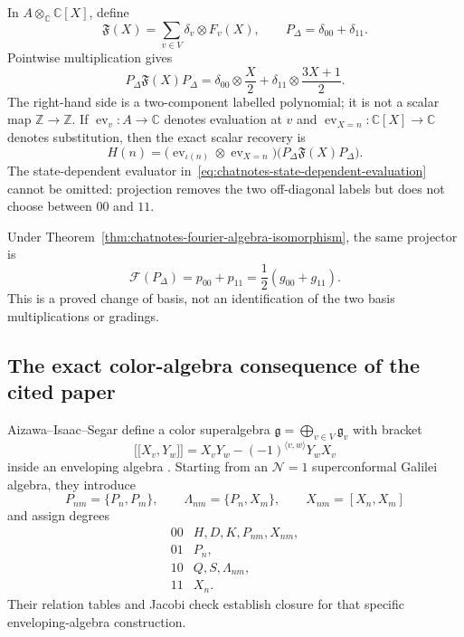 In $A\otimes_{\mathbb C}\mathbb C[X]$, define
\[
 \mathfrak F(X)=\sum_{v\in V}\delta_v\otimes F_v(X),
 \qquad
 P_\Delta=\delta_{00}+\delta_{11}.
\]
Pointwise multiplication gives
\begin{equation}
\label{eq:chatnotes-diagonal-projection}
 P_\Delta\mathfrak F(X)P_\Delta
 =\delta_{00}\otimes\frac X2
  +\delta_{11}\otimes\frac{3X+1}{2}.
\end{equation}
The right-hand side is a two-component labelled polynomial; it is not a
scalar map $\mathbb Z\to\mathbb Z$.  If
$\operatorname{ev}_v:A\to\mathbb C$ denotes evaluation at $v$ and
$\operatorname{ev}_{X=n}:\mathbb C[X]\to\mathbb C$ denotes substitution,
then the exact scalar recovery is
\begin{equation}
\label{eq:chatnotes-state-dependent-evaluation}
 H(n)=
 \bigl(\operatorname{ev}_{\iota(n)}\otimes
       \operatorname{ev}_{X=n}\bigr)
 \bigl(P_\Delta\mathfrak F(X)P_\Delta\bigr).
\end{equation}
The state-dependent evaluator in~\eqref{eq:chatnotes-state-dependent-evaluation}
cannot be omitted: projection removes the two off-diagonal labels but does
not choose between $00$ and $11$.

Under Theorem~\ref{thm:chatnotes-fourier-algebra-isomorphism}, the same
projector is
\begin{equation}
\label{eq:chatnotes-fourier-diagonal-projector}
 \mathcal F(P_\Delta)=p_{00}+p_{11}
 =\frac12(g_{00}+g_{11}).
\end{equation}
This is a proved change of basis, not an identification of the two basis
multiplications or gradings.

\subsection{The exact color-algebra consequence of the cited paper}

Aizawa--Isaac--Segar define a color superalgebra
$\mathfrak g=\bigoplus_{v\in V}\mathfrak g_v$ with bracket
\[
 \mathopen{[\![}X_v,Y_w\mathclose{]\!]}
 =X_vY_w-(-1)^{\langle v,w\rangle}Y_wX_v
\]
inside an enveloping algebra \cite{AizawaIsaacSegar2019}.  Starting from an
$\mathcal N=1$ superconformal Galilei algebra, they introduce
\[
 P_{nm}=\{P_n,P_m\},
 \qquad
 \Lambda_{nm}=\{P_n,X_m\},
 \qquad
 X_{nm}=[X_n,X_m]
\]
and assign degrees
\[
\begin{array}{c|l}
00&H,D,K,P_{nm},X_{nm},\\
01&P_n,\\
10&Q,S,\Lambda_{nm},\\
11&X_n.
\end{array}
\]
Their relation tables and Jacobi check establish closure for that specific
enveloping-algebra construction.

